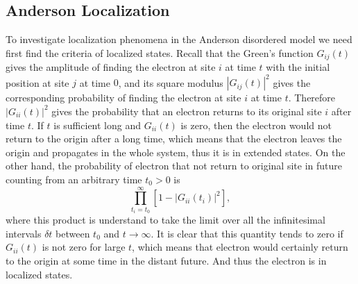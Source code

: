\documentclass{book}
\numberwithin{equation}{section}
\begin{document}
\subsection*{Anderson Localization}
To investigate localization phenomena in the Anderson disordered model
we need first find the criteria of localized states. Recall that the
Green's function $G_{ij}(t)$ gives the amplitude of finding the
electron at site $i$ at time $t$ with the initial position at site $j$
at time $0$, and its square modulus $|G_{ij}(t)|^2$ gives the
corresponding probability of finding the electron at site $i$ at time
$t$. Therefore $|G_{ii}(t)|^2$ gives the probability that an electron
returns to its original site $i$ after time $t$. If $t$ is sufficient
long and $G_{ii}(t)$ is zero, then the electron would not return to
the origin after a long time, which means that the electron leaves the
origin and propagates in the whole system, thus it is in extended
states. On the other hand, the probability of electron that not return
to original site in future counting from an arbitrary time $t_0>0$ is
\begin{equation}
  \prod_{t_i=t_0}^\infty[1-|G_{ii}(t_i)|^2],
\end{equation}
where this product is understand to take the limit over all the
infinitesimal intervals $\delta t$ between $t_0$ and $t\to\infty$.  It
is clear that this quantity tends to zero if $G_{ii}(t)$ is not zero
for large $t$, which means that electron would certainly return to the
origin at some time in the distant future. And thus the electron is in
localized states.
\end{document}

